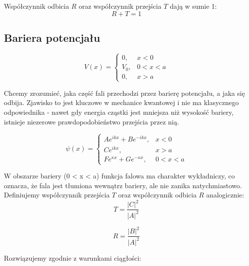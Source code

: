 Współczynnik odbicia $R$ oraz współczynnik przejścia $T$ dają w sumie 1:
\begin{equation*}
    R + T = 1
\end{equation*}



\subsection{Bariera potencjału}
\begin{equation*}
    V(x) = 
    \begin{cases}
        0, & x < 0 \\
        V_0, & 0 < x < a \\
        0, & x > a
    \end{cases}
\end{equation*}

Chcemy zrozumieć, jaka część fali przechodzi przez barierę potencjału, a jaka się odbija.
Zjawisko to jest kluczowe w mechanice kwantowej i nie ma klasycznego odpowiednika - nawet gdy energia cząstki
jest mniejsza niż wysokość bariery, istnieje niezerowe prawdopodobieństwo przejścia przez nią.




\begin{equation*}
    \psi(x) =
    \begin{cases}
        A e^{ikx} + B e^{-ikx}, & x < 0 \\
        C e^{ikx}, & x > a \\
        F e^{\kappa x} + G e^{-\kappa x}, & 0 < x < a
    \end{cases}
\end{equation*}

W obszarze bariery (0 < x < a) funkcja falowa ma charakter wykładniczy, co oznacza,
że fala jest tłumiona wewnątrz bariery, ale nie zanika natychmiastowo. \\

Definiujemy współczynnik przejścia $T$ oraz współczynnik odbicia $R$ analogicznie:
\begin{equation*}
    T = \frac{\left| C \right| ^2}{\left| A \right| ^2}
\end{equation*}

\begin{equation*}
    R = \frac{\left| B \right|^2}{\left| A \right|^2}
\end{equation*}

Rozwiązujemy zgodnie z warunkami ciągłości:


